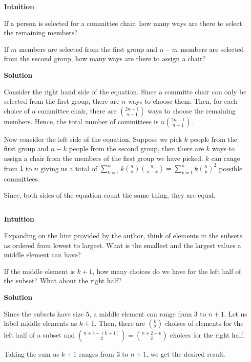\documentclass[]{book}
\begin{document}
\textbf{Intuition}

If a person is selected for a committee chair, how many ways are there
to select the remaining members?

If \(m\) members are selected from the first group and \(n-m\) members
are selected from the second group, how many ways are there to assign a
chair?

 \textbf{Solution}

Consider the right hand side of the equation. Since a committe chair can
only be selected from the first group, there are \(n\) ways to choose
them. Then, for each choice of a committee chair, there are
\({2n-1 \choose n-1}\) ways to choose the remaining members. Hence, the
total number of committees is \(n{2n-1 \choose n-1}\).

Now consider the left side of the equation. Suppose we pick \(k\) people
from the first group and \(n-k\) people from the second group, then
there are \(k\) ways to assign a chair from the members of the first
group we have picked. \(k\) can range from \(1\) to \(n\) giving us a
total of
\(\sum_{k=1}^{n} k{n \choose k}{n \choose n-k} = \sum_{k=1}^{n} k{n \choose k}^{2}\)
possible committees.

Since, both sides of the equation count the same thing, they are equal.

\subsection{}\label{section-18}

\textbf{Intuition}

Expanding on the hint provided by the author, think of elements in the
subsets as ordered from lowest to largest. What is the smallest and the
largest values a middle element can have?

If the middle element is \(k+1\), how many choices do we have for the
left half of the subset? What about the right half?

 \textbf{Solution}

Since the subsets have size \(5\), a middle element can range from \(3\)
to \(n+1\). Let us label middle elements as \(k+1\). Then, there are
\({k \choose 2}\) choises of elements for the left half of a subset and
\({n+3-(k+1) \choose 2} = {n+2-k \choose 2}\) choices for the right
half.

Taking the sum as \(k+1\) ranges from \(3\) to \(n+1\), we get the
desired result.

\subsection{}\label{section-19}
\end{document}
